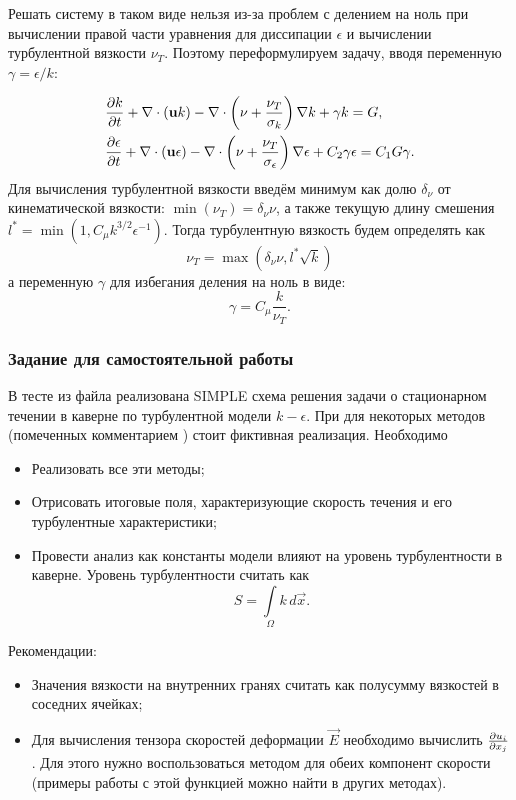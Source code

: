 Решать систему в таком виде нельзя из-за проблем с делением на ноль при вычислении правой части уравнения для диссипации $\epsilon$ и вычислении турбулентной вязкости $\nu_T$.
Поэтому переформулируем задачу, вводя переменную $\gamma = \epsilon/k$:

\begin{align*}
&\frac{\partial k}{\partial t} + \nabla\cdot(\boldsymbol{\rm u} k) - \nabla \cdot \left(\nu + \frac{\nu_T}{\sigma_k}\right)\nabla k + \gamma k = G, \\
&\frac{\partial \epsilon}{\partial t} + \nabla\cdot(\boldsymbol{\rm u} \epsilon) - \nabla \cdot \left(\nu + \frac{\nu_T}{\sigma_\epsilon}\right)\nabla \epsilon + C_2 \gamma \epsilon = 
	C_1 G \gamma.
\end{align*}
Для вычисления турбулентной вязкости введём минимум как долю $\delta_\nu$ от кинематической вязкости: $\min(\nu_T) = \delta_\nu \nu$,
а также текущую длину смешения $l^* = \min(1, C_\mu k ^{3/2} \epsilon^{-1})$.
Тогда турбулентную вязкость будем определять как
\begin{equation}
\label{eq:nut_nozerodiv}
\nu_T = \max(\delta_\nu \nu, l^* \sqrt k)
\end{equation}
а переменную $\gamma$ для избегания деления на ноль в виде:
\begin{equation*}
\gamma = C_\mu \frac{k}{\nu_T}.
\end{equation*}


\subsubsection{Задание для самостоятельной работы}
\label{sec:ke_prog}
В тесте  из файла 
реализована SIMPLE схема решения задачи о стационарном течении в каверне
по турбулентной модели $k-\epsilon$. При для некоторых методов (помеченных комментарием )
стоит фиктивная реализация.
Необходимо
\begin{itemize}
\item Реализовать все эти методы;
\item Отрисовать итоговые поля, характеризующие скорость течения и его турбулентные характеристики;
\item Провести анализ как константы модели влияют на уровень турбулентности в каверне. Уровень турбулентности
      считать как
\begin{equation*}
S = \int\limits_\Omega k \, d\vec x.
\end{equation*}
\end{itemize}

Рекомендации:
\begin{itemize}
\item Значения вязкости на внутренних гранях считать как полусумму вязкостей в соседних ячейках;
\item Для вычисления тензора скоростей деформации $\vec E$ необходимо вычислить $\frac{\partial u_i}{\partial x_j}$.
Для этого нужно воспользоваться методом  для обеих компонент скорости (примеры работы с этой функцией можно найти в других методах).
\end{itemize}

